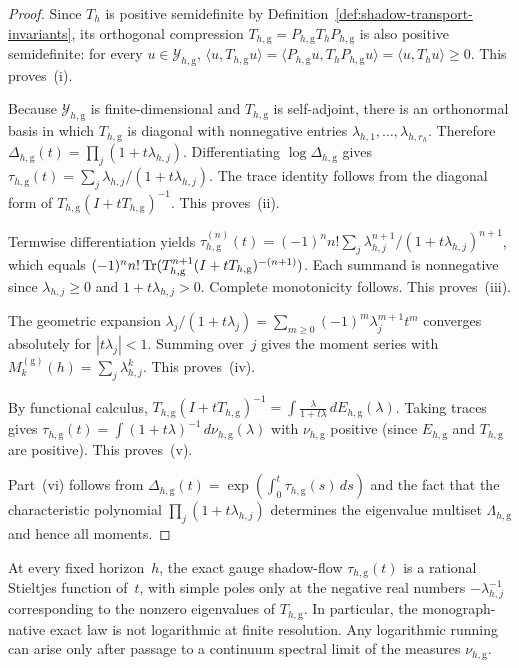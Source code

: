\begin{proof}
Since $T_h$ is positive semidefinite by
Definition~\ref{def:shadow-transport-invariants}, its orthogonal
compression $T_{h,\mathrm g}=P_{h,\mathrm g}T_hP_{h,\mathrm g}$ is also
positive semidefinite: for every $u\in\mathcal Y_{h,\mathrm g}$,
$\langle u,T_{h,\mathrm g}u\rangle
=\langle P_{h,\mathrm g}u,T_hP_{h,\mathrm g}u\rangle
=\langle u,T_hu\rangle\ge 0$.
This proves~(i).

Because $\mathcal Y_{h,\mathrm g}$ is finite-dimensional and
$T_{h,\mathrm g}$ is self-adjoint, there is an orthonormal basis in which
$T_{h,\mathrm g}$ is diagonal with nonneg\-ative entries
$\lambda_{h,1},\dots,\lambda_{h,r_h}$. Therefore
$\Delta_{h,\mathrm g}(t)=\prod_j(1+t\lambda_{h,j})$.
Differentiating $\log\Delta_{h,\mathrm g}$ gives
$\tau_{h,\mathrm g}(t)=\sum_j\lambda_{h,j}/(1+t\lambda_{h,j})$.
The trace identity follows from the diagonal form of
$T_{h,\mathrm g}(I+tT_{h,\mathrm g})^{-1}$.
This proves~(ii).

Termwise differentiation yields
$\tau_{h,\mathrm g}^{(n)}(t)
=(-1)^n n!\sum_j\lambda_{h,j}^{n+1}/(1+t\lambda_{h,j})^{n+1}$,
which equals
$(-1)^n n!\,\mathrm{Tr}(T_{h,\mathrm g}^{n+1}(I+tT_{h,\mathrm g})^{-(n+1)})$.
Each summand is nonneg\-ative since $\lambda_{h,j}\ge 0$ and
$1+t\lambda_{h,j}>0$. Complete monotonicity follows.
This proves~(iii).

The geometric expansion
$\lambda_j/(1+t\lambda_j)=\sum_{m\ge 0}(-1)^m\lambda_j^{m+1}t^m$
converges absolutely for $|t\lambda_j|<1$. Summing over~$j$ gives the
moment series with $M_k^{(\mathrm g)}(h)=\sum_j\lambda_{h,j}^k$.
This proves~(iv).

By functional calculus,
$T_{h,\mathrm g}(I+tT_{h,\mathrm g})^{-1}
=\int\frac{\lambda}{1+t\lambda}\,dE_{h,\mathrm g}(\lambda)$.
Taking traces gives
$\tau_{h,\mathrm g}(t)=\int(1+t\lambda)^{-1}\,d\nu_{h,\mathrm g}(\lambda)$
with $\nu_{h,\mathrm g}$ positive (since $E_{h,\mathrm g}$ and
$T_{h,\mathrm g}$ are positive). This proves~(v).

Part~(vi) follows from $\Delta_{h,\mathrm g}(t)
=\exp(\int_0^t\tau_{h,\mathrm g}(s)\,ds)$ and the fact that the
characteristic polynomial $\prod_j(1+t\lambda_{h,j})$ determines the
eigenvalue multiset $\Lambda_{h,\mathrm g}$ and hence all moments.
\end{proof}

\begin{corollary}
\label{cor:finite-horizon-nonlogarithmic-distinctness}
At every fixed horizon~$h$, the exact gauge shadow-flow
$\tau_{h,\mathrm g}(t)$ is a rational Stieltjes function of~$t$,
with simple poles only at the negative real numbers
$-\lambda_{h,j}^{-1}$ corresponding to the nonzero eigenvalues of
$T_{h,\mathrm g}$. In particular, the monograph-native exact law is not
logarithmic at finite resolution. Any logarithmic running can arise only
after passage to a continuum spectral limit of the measures
$\nu_{h,\mathrm g}$.
\end{corollary}

